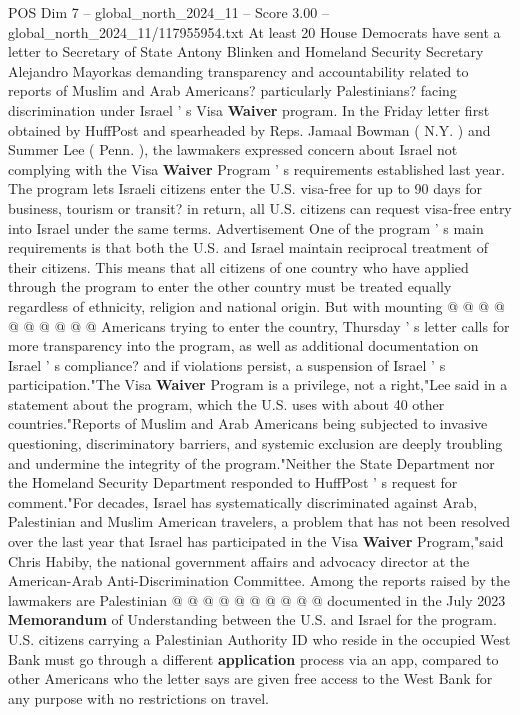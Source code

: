 \begin{textsample}{POS Dim 7 – global\_north\_2024\_11 – Score 3.00 – global\_north\_2024\_11/117955954.txt}  \label{ex:f7_pos_190}
At least 20 House Democrats have sent a letter to Secretary of State Antony Blinken and Homeland Security Secretary Alejandro Mayorkas demanding transparency and accountability related to reports of Muslim and Arab Americans? particularly Palestinians? facing discrimination under Israel ' s Visa \textbf{Waiver} program.
In the Friday letter first obtained by HuffPost and spearheaded by Reps.
Jamaal Bowman ( N.Y. ) and Summer Lee ( Penn. ), the lawmakers expressed concern about Israel not complying with the Visa \textbf{Waiver} Program ' s requirements established last year.
The program lets Israeli citizens enter the U.S. visa-free for up to 90 days for business, tourism or transit? in return, all U.S. citizens can request visa-free entry into Israel under the same terms.
Advertisement One of the program ' s main requirements is that both the U.S. and Israel maintain reciprocal treatment of their citizens.
This means that all citizens of one country who have applied through the program to enter the other country must be treated equally regardless of ethnicity, religion and national origin.
But with mounting @ @ @ @ @ @ @ @ @ @ Americans trying to enter the country, Thursday ' s letter calls for more transparency into the program, as well as additional documentation on Israel ' s compliance? and if violations persist, a suspension of Israel ' s participation."The Visa \textbf{Waiver} Program is a privilege, not a right,"Lee said in a statement about the program, which the U.S. uses with about 40 other countries."Reports of Muslim and Arab Americans being subjected to invasive questioning, discriminatory barriers, and systemic exclusion are deeply troubling and undermine the integrity of the program."Neither the State Department nor the Homeland Security Department responded to HuffPost ' s request for comment."For decades, Israel has systematically discriminated against Arab, Palestinian and Muslim American travelers, a problem that has not been resolved over the last year that Israel has participated in the Visa \textbf{Waiver} Program,"said Chris Habiby, the national government affairs and advocacy director at the American-Arab Anti-Discrimination Committee.
Among the reports raised by the lawmakers are Palestinian @ @ @ @ @ @ @ @ @ @ documented in the July 2023 \textbf{Memorandum} of Understanding between the U.S. and Israel for the program.
U.S. citizens carrying a Palestinian Authority ID who reside in the occupied West Bank must go through a different \textbf{application} process via an app, compared to other Americans who the letter says are given free access to the West Bank for any purpose with no restrictions on travel.

\end{textsample}
